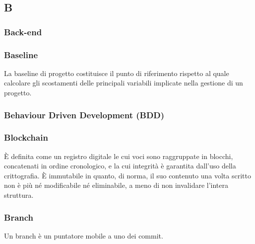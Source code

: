 \subsection*{\textbf{\hfill \Huge{B} \hfill}} 
\subsubsection*{Back-end}

\subsubsection*{Baseline}
La baseline di progetto costituisce il punto di riferimento rispetto al quale calcolare gli scostamenti delle principali variabili implicate nella gestione di un progetto.
\subsubsection*{Behaviour Driven Development (BDD)}

\subsubsection*{Blockchain}
È definita come un registro digitale le cui voci sono raggruppate in blocchi, concatenati in ordine cronologico, e la cui integrità è garantita dall’uso della crittografia. È immutabile in quanto, di norma, il suo contenuto una volta scritto non è più né modificabile né eliminabile, a meno di non invalidare l’intera struttura.
\subsubsection*{Branch}
Un branch è un puntatore mobile a uno dei commit.
